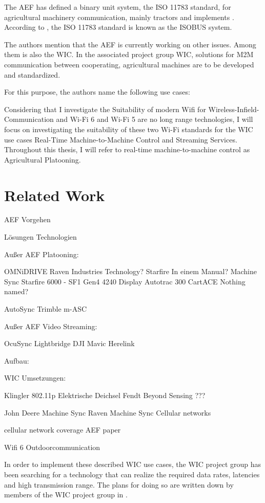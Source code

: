\documentclass[]{nsm-thesis}
\begin{document}
The AEF has defined a binary unit system, the ISO 11783 standard, for agricultural machinery communication, mainly tractors and implements \cite{iglesias_enabling_2014}. According to \textcite{schlingmann_aef_2019}, the ISO 11783 standard is known as the ISOBUS system.

The authors mention that the AEF is currently working on other issues. Among them is also the \ac{WIC}. In the associated project group \ac{WIC}, solutions for \ac{M2M} communication between cooperating, agricultural machines are to be developed and standardized.

For this purpose, the authors name the following use cases:


Considering that I investigate the Suitability of modern Wifi for Wireless-Infield-Communication and Wi-Fi 6 and Wi-Fi 5 are no long range technologies, I will focus on investigating the suitability of these two Wi-Fi standards for the \ac{WIC} use cases Real-Time Machine-to-Machine Control and Streaming Services. Throughout this thesis, I will refer to real-time machine-to-machine control as Agricultural Platooning.
\section{Related Work}
AEF Vorgehen

Lösungen
Technologien

Außer AEF Platooning:

	OMNiDRIVE Raven Industries Technology? Starfire In einem Manual?
	Machine Sync Starfire 6000 - SF1 Gen4 4240 Display Autotrac 300 
	CartACE Nothing named? 
	
	AutoSync Trimble m-ASC

Außer AEF Video Streaming:

	OcuSync
	Lightbridge DJI Mavic
	Herelink




Aufbau:

WIC Umsetzungen: 

Klingler 802.11p
Elektrische Deichsel Fendt
Beyond Sensing ???

John Deere Machine Sync
Raven Machine Sync
Cellular networks

cellular network coverage AEF paper 

Wifi 6 Outdoorcommunication



In order to implement these described \ac{WIC} use cases, the \ac{WIC} project group has been searching for a technology that can realize the required data rates, latencies and high transmission range. The plans for doing so are written down by members of the \ac{WIC} project group in \cite{schlingmann_challenges_2017}.
\end{document}
